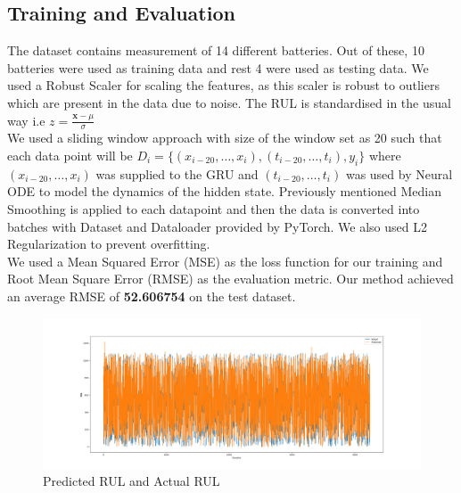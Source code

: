 \documentclass[12pt]{article}
\begin{document}
		\subsection{Training and Evaluation}
		The dataset contains measurement of 14 different batteries. Out of these, 10 batteries were used as training data and rest 4 were used as testing data. We used a Robust Scaler for scaling the features, as this scaler is robust to outliers which are present in the data due to noise. The RUL is standardised in the usual way i.e $z = \frac{\mathbf{x} - \mu}{\sigma}$
		\\
		We used a sliding window approach with size of the window set as 20 such that each data point will be $D_i = \{(x_{i-20}, \dots, x_i), (t_{i-20}, \dots, t_i), y_i\}$ where $(x_{i-20}, \dots, x_i)$ was supplied to the GRU and $(t_{i-20}, \dots, t_i)$ was used by Neural ODE to model the dynamics of the hidden state. Previously mentioned Median Smoothing is applied to each datapoint and then the data is converted into batches with Dataset and Dataloader provided by PyTorch. We also used L2 Regularization to prevent overfitting.
		\\
		We used a Mean Squared Error (MSE) as the loss function for our training and Root Mean Square Error (RMSE) as the evaluation metric.
		Our method achieved an average RMSE of \textbf{52.606754} on the test dataset.
		\begin{figure}[h]
			\centering
			\includegraphics[width=\textwidth]{imgs/predicted.png}
			\caption{Predicted RUL and Actual RUL}
		\end{figure}
			
			
	
\end{document}

